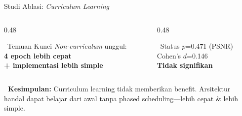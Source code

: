 \documentclass[aspectratio=169,10pt,t]{beamer}
\begin{document}
\begin{frame}{Studi Ablasi: \textit{Curriculum Learning}}
    \vspace{0.5em}
    \begin{columns}[T]
        \begin{column}{0.48\textwidth}
            \begin{alertblock}{\faExclamation~Temuan Kunci}
                \textit{Non-curriculum} unggul:\\
                \textbf{4 epoch lebih cepat}\\
                \textbf{+ implementasi lebih simple}
            \end{alertblock}
        \end{column}
        \begin{column}{0.48\textwidth}
            \begin{exampleblock}{\faBalanceScale~Status}
                $p$=0.471 (PSNR)\\
                Cohen's $d$=0.146\\
                \textbf{Tidak signifikan}
            \end{exampleblock}
        \end{column}
    \end{columns}
    
    \vspace{0.3em}
    \textbf{\faCheckDouble~Kesimpulan:} Curriculum learning tidak memberikan benefit. Arsitektur handal dapat belajar dari awal tanpa phased scheduling—lebih cepat \& lebih simple.
\end{frame}
\end{document}
